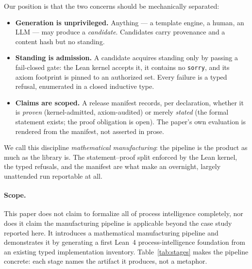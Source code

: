 \documentclass[11pt]{article}
\begin{document}
Our position is that the two concerns should be mechanically separated:

\begin{itemize}
\item \textbf{Generation is unprivileged.} Anything --- a template engine, a
  human, an LLM --- may produce a \emph{candidate}. Candidates carry
  provenance and a content hash but no standing.
\item \textbf{Standing is admission.} A candidate acquires standing only by
  passing a fail-closed gate: the Lean kernel accepts it, it contains no
  \texttt{sorry}, and its axiom footprint is pinned to an authorized set.
  Every failure is a typed refusal, enumerated in a closed inductive type.
\item \textbf{Claims are scoped.} A release manifest records, per
  declaration, whether it is \emph{proven} (kernel-admitted, axiom-audited)
  or merely \emph{stated} (the formal statement exists; the proof
  obligation is open). The paper's own evaluation is rendered from the
  manifest, not asserted in prose.
\end{itemize}

We call this discipline \emph{mathematical manufacturing}: the pipeline is
the product as much as the library is. The statement--proof split enforced
by the Lean kernel, the typed refusals, and the manifest are what make an
overnight, largely unattended run reportable at all.

\paragraph{Scope.} This paper does not claim to formalize all of process
intelligence completely, nor does it claim the manufacturing pipeline is
applicable beyond the case study reported here. It introduces a
mathematical manufacturing pipeline and demonstrates it by generating a
first Lean~4 process-intelligence foundation from an existing typed
implementation inventory. Table~\ref{tab:stages} makes the pipeline
concrete: each stage names the artifact it produces, not a metaphor.
\end{document}
